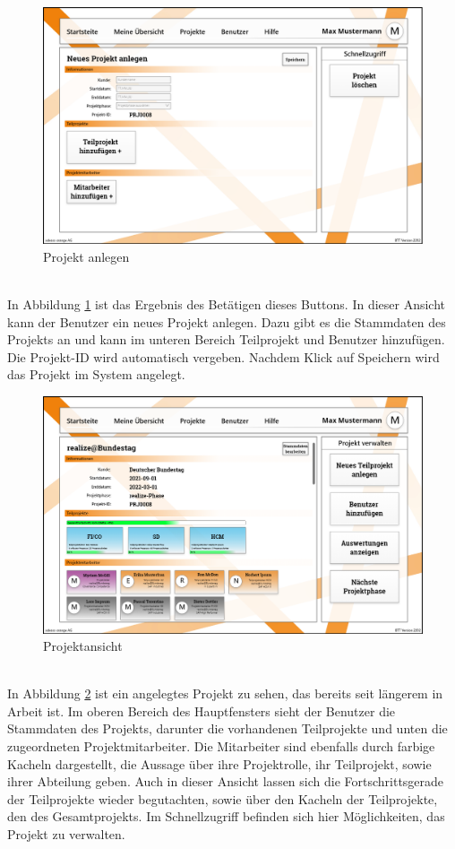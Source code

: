 \begin{figure}[h!]
    \centering
    \includegraphics[scale=0.4]{./Prototyp/042_Projekt bearbeiten.png}
    \caption[Prototyp: Projekt anlegen]{Projekt anlegen}
    \label{fig:ProjektAnlegen}
\end{figure}
\\In Abbildung \ref{fig:ProjektAnlegen} ist das Ergebnis des Betätigen dieses Buttons. In dieser Ansicht kann der Benutzer ein neues Projekt anlegen. Dazu gibt es die Stammdaten des Projekts an und kann im unteren Bereich Teilprojekt und Benutzer hinzufügen. Die Projekt-ID wird automatisch vergeben. Nachdem Klick auf \glqq{}Speichern\grqq{} wird das Projekt im System angelegt. 
\begin{figure}[h!]
    \centering
    \includegraphics[scale=0.4]{./Prototyp/041_Projekt Ansicht.png}
    \caption[Prototyp: Projektansicht]{Projektansicht}
    \label{fig:Projektansicht}
\end{figure}
\\In Abbildung \ref{fig:Projektansicht} ist ein angelegtes Projekt zu sehen, das bereits seit längerem in Arbeit ist. Im oberen Bereich des Hauptfensters sieht der Benutzer die Stammdaten des Projekts, darunter die vorhandenen Teilprojekte und unten die zugeordneten Projektmitarbeiter. Die Mitarbeiter sind ebenfalls durch farbige Kacheln dargestellt, die Aussage über ihre Projektrolle, ihr Teilprojekt, sowie ihrer Abteilung geben. Auch in dieser Ansicht lassen sich die Fortschrittsgerade der Teilprojekte wieder begutachten, sowie über den Kacheln der Teilprojekte, den des Gesamtprojekts. Im Schnellzugriff befinden sich hier Möglichkeiten, das Projekt zu verwalten.
